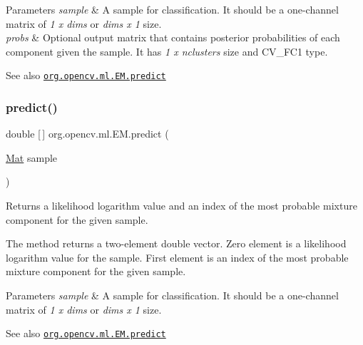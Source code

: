 \begin{DoxyParams}{Parameters}
{\em sample} & A sample for classification. It should be a one-\/channel matrix of {\itshape 1 x dims} or {\itshape dims x 1} size. \\
\hline
{\em probs} & Optional output matrix that contains posterior probabilities of each component given the sample. It has {\itshape 1 x nclusters} size and {\ttfamily C\+V\+\_\+F\+C1} type.\\
\hline
\end{DoxyParams}
\begin{DoxySeeAlso}{See also}
\href{http://docs.opencv.org/modules/ml/doc/expectation_maximization.html#em-predict}{\tt org.\+opencv.\+ml.\+E\+M.\+predict} 
\end{DoxySeeAlso}
\mbox{\label{classorg_1_1opencv_1_1ml_1_1_e_m_a948b3059f105aee81e1380d14700abf6}} 
\subsubsection{\texorpdfstring{predict()}{predict()}\hspace{0.1cm}{\footnotesize\ttfamily [2/2]}}
{\footnotesize\ttfamily double \mbox{[}$\,$\mbox{]} org.\+opencv.\+ml.\+E\+M.\+predict (\begin{DoxyParamCaption}\item[{\mbox{\hyperlink{classorg_1_1opencv_1_1core_1_1_mat}{Mat}}}]{sample }\end{DoxyParamCaption})}

Returns a likelihood logarithm value and an index of the most probable mixture component for the given sample.

The method returns a two-\/element {\ttfamily double} vector. Zero element is a likelihood logarithm value for the sample. First element is an index of the most probable mixture component for the given sample.


\begin{DoxyParams}{Parameters}
{\em sample} & A sample for classification. It should be a one-\/channel matrix of {\itshape 1 x dims} or {\itshape dims x 1} size.\\
\hline
\end{DoxyParams}
\begin{DoxySeeAlso}{See also}
\href{http://docs.opencv.org/modules/ml/doc/expectation_maximization.html#em-predict}{\tt org.\+opencv.\+ml.\+E\+M.\+predict} 
\end{DoxySeeAlso}
\mbox{\label{classorg_1_1opencv_1_1ml_1_1_e_m_ac03590c48e384f486b3a205a0a9692d6}} 
